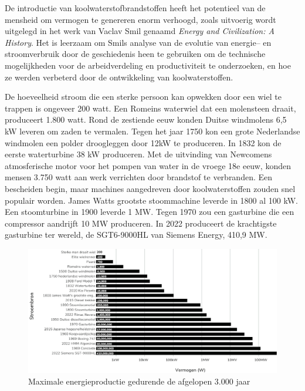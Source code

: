 De introductie van koolwaterstofbrandstoffen heeft het potentieel van de mensheid om vermogen te genereren enorm verhoogd, zoals uitvoerig wordt uitgelegd in het werk van Vaclav Smil genaamd \emph{Energy and Civilization: A History}. \autocite{96} Het is leerzaam om Smil\textquotesingle s analyse van de evolutie van energie-- en stroomverbruik door de geschiedenis heen te gebruiken om de technische mogelijkheden voor de arbeidverdeling en productiviteit te onderzoeken, en hoe ze werden verbeterd door de ontwikkeling van koolwaterstoffen.

De hoeveelheid stroom die een sterke persoon kan opwekken door een wiel te trappen is ongeveer 200 watt. Een Romeins waterwiel dat een molensteen draait, produceert 1.800 watt. Rond de zestiende eeuw konden Duitse windmolens 6,5 kW leveren om zaden te vermalen. Tegen het jaar 1750 kon een grote Nederlandse windmolen een polder droogleggen door 12kW te produceren. In 1832 kon de eerste waterturbine 38 kW produceren. Met de uitvinding van Newcomen\textquotesingle s atmosferische motor voor het pompen van water in de vroege 18e eeuw, konden mensen 3.750 watt aan werk verrichten door brandstof te verbranden. Een bescheiden begin, maar machines aangedreven door koolwaterstoffen zouden snel populair worden. James Watt\textquotesingle s grootste stoommachine leverde in 1800 al 100 kW. Een stoomturbine in 1900 leverde 1 MW. Tegen 1970 zou een gasturbine die een compressor aandrijft 10 MW produceren. In 2022 produceert de krachtigste gasturbine ter wereld, de SGT6-9000HL van Siemens Energy, 410,9 MW.

\begin{figure}[!htb]
\centering
    \includegraphics[width=\textwidth]{figures/fig9-1.png}
    \caption[Maximale energieproductie gedurende de afgelopen 3.000 jaar]{Maximale energieproductie gedurende de afgelopen 3.000 jaar}
    \label{fig9}
\end{figure}

